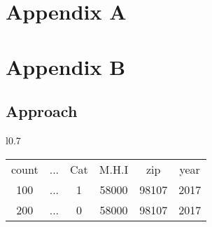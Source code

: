 \documentclass[12pt]{article}
\begin{document}
	\section{Appendix A}

	\section{Appendix B}

	\subsection{Approach}

	\begin{wraptable}{l}{0.7\linewidth}
		\centering
		\begin{tabular}{|c||c||c||c||c|c|}
			\hline
			count & ... & Cat & M.H.I & zip & year \\
			100 & ... & 1 & 58000 & 98107 & 2017 \\
			200 & ... & 0 & 58000 & 98107 & 2017 \\
			\hline
		\end{tabular}
	\end{wraptable}

\end{document}
